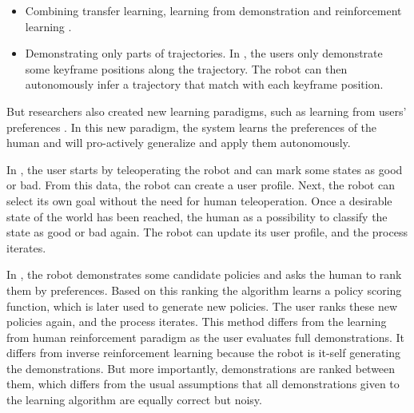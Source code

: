 \begin{itemize}
\item Combining transfer learning, learning from demonstration and reinforcement learning \cite{taylor2011integrating}.

\item Demonstrating only parts of trajectories. In \cite{akgun12hri}, the users only demonstrate some keyframe positions along the trajectory. The robot can then autonomously infer a trajectory that match with each keyframe position.

\end{itemize}

But researchers also created new learning paradigms, such as learning from users' preferences \cite{Mason2011,akrour2011preference}. In this new paradigm, the system learns the preferences of the human and will pro-actively generalize and apply them autonomously.

In \cite{Mason2011}, the user starts by teleoperating the robot and can mark some states as good or bad. From this data, the robot can create a user profile. Next, the robot can select its own goal without the need for human teleoperation. Once a desirable state of the world has been reached, the human as a possibility to classify the state as good or bad again. The robot can update its user profile, and the process iterates.


In \cite{akrour2011preference,akrour2012april,akrour2014programming,wilson2012bayesian}, the robot demonstrates some candidate policies and asks the human to rank them by preferences. Based on this ranking the algorithm learns a policy scoring function, which is later used to generate new policies. The user ranks these new policies again, and the process iterates. This method differs from the learning from human reinforcement paradigm as the user evaluates full demonstrations. It differs from inverse reinforcement learning because the robot is it-self generating the demonstrations. But more importantly, demonstrations are ranked between them, which differs from the usual assumptions that all demonstrations given to the learning algorithm are equally correct but noisy.


